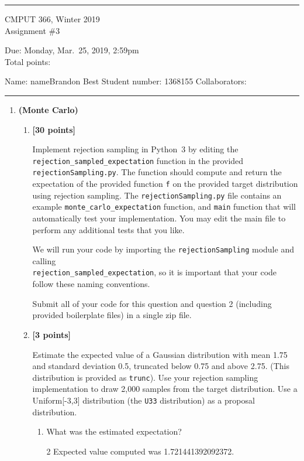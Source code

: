 \documentclass{article}
\newcounter{totalpoints}
\newcommand{\points}[1]{{\addtocounter{totalpoints}{#1}\textbf{[#1 points]}}}
\begin{document}
{\bigskip\hrule\bigskip

\huge
\noindent CMPUT 366, Winter 2019\\
Assignment \#3

\large
Due: Monday, Mar.\ 25, 2019, 2:59pm\\
Total points: 

\normalsize
Name: {name}Brandon Best
Student number: 1368155
Collaborators:

\bigskip\hrule\bigskip
}

\pagestyle{myheadings}

\begin{enumerate}

\item \textbf{(Monte Carlo)}

\begin{enumerate}
\item \points{30}
Implement rejection sampling in Python~3 by editing the \verb|rejection_sampled_expectation| function in the provided \texttt{rejectionSampling.py}.  The function should compute and return the expectation of the provided function \texttt{f} on the provided target distribution using rejection sampling.  The \texttt{rejectionSampling.py} file contains an example \verb|monte_carlo_expectation| function, and \verb|main| function that will automatically test your implementation.  You may edit the main file to perform any additional tests that you like.

We will run your code by importing the \verb|rejectionSampling| module and calling \\\verb|rejection_sampled_expectation|, so it is important that your code follow these naming conventions.

Submit all of your code for this question and question 2 (including provided boilerplate files) in a single zip file.

\item \points{3}
Estimate the expected value of a Gaussian distribution with mean 1.75 and standard deviation 0.5, truncated below 0.75 and above 2.75.  (This distribution is provided as \verb|trunc|).
Use your rejection sampling implementation to draw 2,000 samples from the target distribution.
Use a Uniform[-3,3] distribution (the \verb|U33| distribution) as a proposal distribution.
\begin{enumerate}
    \item What was the estimated expectation?
    \begin{answer}{2\baselineskip}
    Expected value computed was 1.721441392092372.
    \end{answer}


\end{enumerate}
\end{enumerate}
\end{enumerate}
\end{document}

